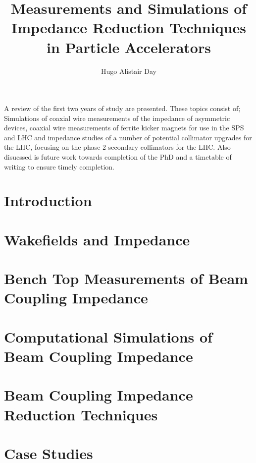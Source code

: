 \documentclass[12pt,PhD]{Thesis}
\begin{document}
%
\title{Measurements and Simulations of Impedance Reduction Techniques in Particle Accelerators}
\author{Hugo Alistair Day}


\beforeabstract
{}
A review of the first two years of study are presented. These topics consist of; Simulations of coaxial wire measurements of the impedance of asymmetric devices, coaxial wire measurements of ferrite kicker magnets for use in the SPS and LHC and impedance studies of a number of potential collimator upgrades for the LHC, focusing on the phase 2 secondary collimators for the LHC. Also disucssed is future work towards completion of the PhD and a timetable of writing to ensure timely completion.
\afterabstract
\afterpreface


\tableofcontents

%
%
%



\chapter{Introduction}


\chapter{Wakefields and Impedance}


\chapter{Bench Top Measurements of Beam Coupling Impedance}
%


\chapter{Computational Simulations of Beam Coupling Impedance}



\chapter{Beam Coupling Impedance Reduction Techniques}

\chapter{Case Studies}




\end{document}
